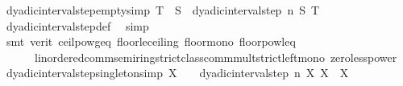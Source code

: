 \begin{isabellebody}
{}%
%
\isamarkupfalse%
\ dyadic{\isacharunderscore}{\kern0pt}interval{\isacharunderscore}{\kern0pt}step{\isacharunderscore}{\kern0pt}empty{\isacharbrackleft}{\kern0pt}simp{\isacharbrackright}{\kern0pt}{\isacharcolon}{\kern0pt}\ {\isachardoublequoteopen}T\ {\isacharless}{\kern0pt}\ S\ {\isasymLongrightarrow}\ dyadic{\isacharunderscore}{\kern0pt}interval{\isacharunderscore}{\kern0pt}step\ n\ S\ T\ {\isacharequal}{\kern0pt}\ {\isacharbraceleft}{\kern0pt}{\isacharbraceright}{\kern0pt}{\isachardoublequoteclose}\isanewline
%
\isadelimproof
\ \ %
\endisadelimproof
%
\isatagproof
{}\isamarkupfalse%
\ dyadic{\isacharunderscore}{\kern0pt}interval{\isacharunderscore}{\kern0pt}step{\isacharunderscore}{\kern0pt}def\ \isamarkupfalse%
\ simp\isanewline
\ \ \isamarkupfalse%
\ {\isacharparenleft}{\kern0pt}smt\ {\isacharparenleft}{\kern0pt}verit{\isacharparenright}{\kern0pt}\ ceil{\isacharunderscore}{\kern0pt}pow{}{\isacharunderscore}{\kern0pt}geq\ floor{\isacharunderscore}{\kern0pt}le{\isacharunderscore}{\kern0pt}ceiling\ floor{\isacharunderscore}{\kern0pt}mono\ floor{\isacharunderscore}{\kern0pt}pow{}{\isacharunderscore}{\kern0pt}leq\isanewline
\ \ \ \ \ \ linordered{\isacharunderscore}{\kern0pt}comm{\isacharunderscore}{\kern0pt}semiring{\isacharunderscore}{\kern0pt}strict{\isacharunderscore}{\kern0pt}class{\isachardot}{\kern0pt}comm{\isacharunderscore}{\kern0pt}mult{\isacharunderscore}{\kern0pt}strict{\isacharunderscore}{\kern0pt}left{\isacharunderscore}{\kern0pt}mono\ zero{\isacharunderscore}{\kern0pt}less{\isacharunderscore}{\kern0pt}power{\isacharparenright}{\kern0pt}%
\endisatagproof
{\isafoldproof}%
%
\isadelimproof
\isanewline
%
\endisadelimproof
\isanewline
{}\isamarkupfalse%
\ dyadic{\isacharunderscore}{\kern0pt}interval{\isacharunderscore}{\kern0pt}step{\isacharunderscore}{\kern0pt}singleton{\isacharbrackleft}{\kern0pt}simp{\isacharbrackright}{\kern0pt}{\isacharcolon}{\kern0pt}\ {\isachardoublequoteopen}X\ {\isasymin}\ {\isasymint}\ {\isasymLongrightarrow}\ dyadic{\isacharunderscore}{\kern0pt}interval{\isacharunderscore}{\kern0pt}step\ n\ X\ X\ {\isacharequal}{\kern0pt}\ {\isacharbraceleft}{\kern0pt}X{\isacharbraceright}{\kern0pt}{\isachardoublequoteclose}\isanewline

\end{isabellebody}
